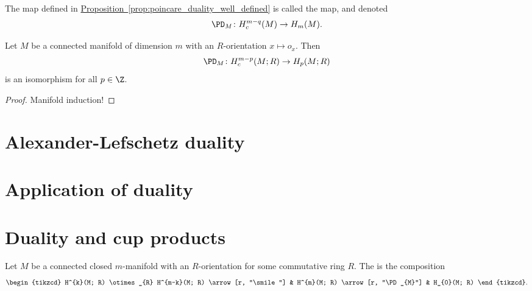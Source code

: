 \documentclass[main.tex]{subfiles}
\begin{document}
\begin{definition}
  \label{def:poincare_duality}
  The map defined in \hyperref[prop:poincare_duality_well_defined]{Proposition~\ref*{prop:poincare_duality_well_defined}} is called the  map, and denoted
  \begin{equation*}
    \PD_{M}\colon H^{m-q}_{c}(M) \to H_{m}(M).
  \end{equation*}
\end{definition}

\begin{theorem}
  Let \(M\) be a connected manifold of dimension \(m\) with an \(R\)-orientation \(x \mapsto o_{x}\). Then
  \begin{equation*}
    \PD_{M}\colon H^{m-p}_{c}(M; R) \to H_{p}(M; R)
  \end{equation*}
  is an isomorphism for all \(p \in \Z\).
\end{theorem}
\begin{proof}
  Manifold induction!
\end{proof}

\section{Alexander-Lefschetz duality}
\label{sec:alexander_lefschetz_duality}

\section{Application of duality}
\label{sec:application_of_duality}

\section{Duality and cup products}
\label{sec:duality_and_cup_products}

\begin{definition}
  \label{def:cup_pairing}
  Let \(M\) be a connected closed \(m\)-manifold with an \(R\)-orientation for some commutative ring \(R\). The  is the composition
  \begin{equation*}
    \begin{tikzcd}
      H^{k}(M; R) \otimes_{R} H^{m-k}(M; R)
      \arrow[r, "\smile"]
      & H^{m}(M; R)
      \arrow[r, "\PD_{M}"]
      & H_{0}(M; R)
    \end{tikzcd}.
  \end{equation*}
\end{definition}
\end{document}

